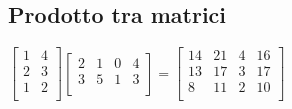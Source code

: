\subsection{Prodotto tra matrici}
\(
\begin{bmatrix}
	1 & 4 \\[-0.2em]
	2 & 3 \\[-0.2em]
	1 & 2 \\
\end{bmatrix}
\begin{bmatrix}
	2 & 1 & 0 & 4 \\[-0.2em]
	3 & 5 & 1 & 3 \\
\end{bmatrix}
=
\begin{bmatrix}
	14 & 21 & 4 & 16 \\[-0.2em]
	13 & 17 & 3 & 17 \\[-0.2em]
	8 & 11 & 2 & 10 \\
\end{bmatrix}
\)